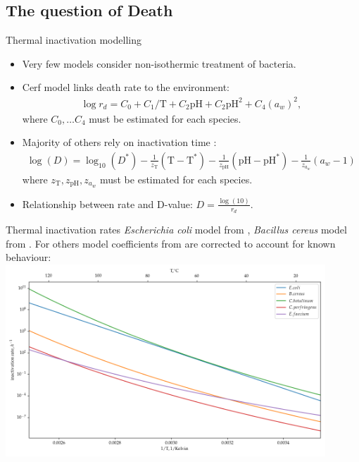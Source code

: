 \documentclass[mathserif,11pt]{beamer}
\begin{document}
\subsection{The question of Death}
\begin{frame}{Thermal inactivation modelling}
\begin{itemize}
	\item Very few models consider non-isothermic treatment of bacteria.
	\item Cerf model \cite{Cerf1996} links death rate to the environment:
	\begin{align*}
		\log{r_d} = C_0 + C_1 / \mathrm{T} + C_2 \mathrm{pH} + C_2 \mathrm{pH}^2 + C_4 (a_w)^2,
	\end{align*}
	where $C_0, \dots C_4$ must be estimated for each species.
	\item Majority of others rely on inactivation time \cite{GAILLARD1998}:
	\begin{align*}
		\log(D) = \log_{10}(D^{\ast}) - \frac{1}{z_{\mathrm{T}}}(\mathrm{T} - \mathrm{T}^{\ast}) - \frac{1}{z_{\mathrm{pH}}}(\mathrm{pH} - \mathrm{pH}^{\ast}) - \frac{1}{z_{a_w}}(a_w - 1)
	\end{align*}
	where $z_{\mathrm{T}}, z_{\mathrm{pH}}, z_{a_w}$ must be estimated for each species.
	\item Relationship between rate and D-value: $D = \frac{\log(10)}{r_d}$.
\end{itemize} 
\end{frame}
\begin{frame}{Thermal inactivation rates}
\textit{Escherichia coli} model from \cite{Cerf1996}, \textit{Bacillus cereus} model from \cite{GAILLARD1998}. For others model coefficients from \cite{GAILLARD1998} are corrected to account for known behaviour:\\
\centering
	\includegraphics[width=0.9\textwidth]{Figures/Cerf_death_rates.png}
\end{frame}
\end{document}
